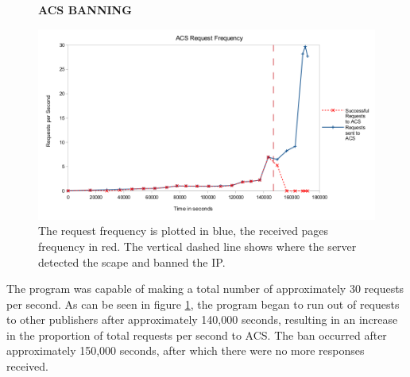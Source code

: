 \begin{figure}[H]
    \centering
    \textbf{ACS BANNING}\par\medskip
    \includegraphics[width=\textwidth]{Data_Acquisition/ACS_crash_line.png}
    \caption[Request Frequency Leading to ACS Ban]{The request frequency is plotted in blue, the received pages frequency in red. The vertical dashed line shows where the server detected the scape and banned the IP.}
     \label{fig:ACSBAN}
\end{figure}
The program was capable of making a total number of approximately 30 requests per second. As can be seen in figure \ref{fig:ACSBAN}, the program began to run out of requests to other publishers after approximately 140,000 seconds, resulting in an increase in the proportion of total requests per second to ACS. The ban occurred after approximately 150,000 seconds, after which there were no more responses received.
